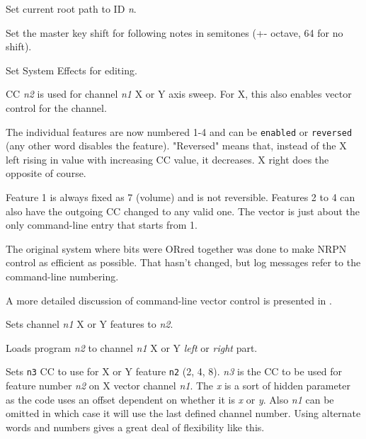       Set current root path to ID \textsl{n}.

      Set the master key shift for following notes in semitones (+-
      octave, 64 for no shift).

      Set System Effects for editing.

      CC \textsl{n2} is used for channel \textsl{n1} X or Y axis sweep.
      For X, this also enables vector control for the channel.

      The individual features are now numbered 1-4 and can be
       \texttt{enabled} or
       \texttt{reversed} (any
      other word disables the feature).
      "Reversed" means that, instead of the X left rising in
      value with increasing CC value, it decreases.
      X right does the opposite of course.

      Feature 1 is always fixed as 7 (volume) and is not reversible.
      Features 2 to 4 can also have the outgoing CC changed to any valid one.
      The vector is just about the only command-line
      entry that starts from 1.

      The original system where bits were ORred together was done to make NRPN
      control as efficient as possible. That hasn't changed, but log messages
      refer to the command-line numbering.

      A more detailed discussion of command-line vector control is presented in
      .

      Sets channel \textsl{n1} X or Y features to \textsl{n2}.

      Loads program \textsl{n2} to channel \textsl{n1} X or Y
      \textsl{left} or \textsl{right} part.

      Sets \texttt{n3} CC to use for X or Y feature \texttt{n2} (2, 4, 8).
      \textsl{n3} is the CC to be used for feature number \textsl{n2} on X
      vector channel \textsl{n1}. The \textsl{x} is a sort of hidden parameter
      as the code uses an offset dependent on whether it is \textsl{x} or
      \textsl{y}. Also \textsl{n1} can be omitted in which case it will use the
      last defined channel number. Using alternate words and numbers gives a
      great deal of flexibility like this.

